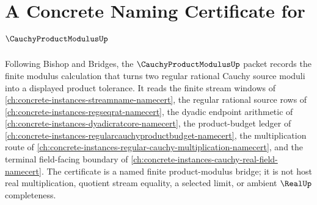 \chapter{A Concrete Naming Certificate for $\CauchyProductModulusUp$}
\label{ch:concrete-instances-cauchy-product-modulus-namecert}

Following Bishop and Bridges, the $\CauchyProductModulusUp$ packet records the finite modulus calculation that turns two regular rational Cauchy source moduli into a displayed product tolerance. It reads the finite stream windows of \autoref{ch:concrete-instances-streamname-namecert}, the regular rational source rows of \autoref{ch:concrete-instances-regseqrat-namecert}, the dyadic endpoint arithmetic of \autoref{ch:concrete-instances-dyadicratcore-namecert}, the product-budget ledger of \autoref{ch:concrete-instances-regularcauchyproductbudget-namecert}, the multiplication route of \autoref{ch:concrete-instances-regular-cauchy-multiplication-namecert}, and the terminal field-facing boundary of \autoref{ch:concrete-instances-cauchy-real-field-namecert}. The certificate is a named finite product-modulus bridge; it is not host real multiplication, quotient stream equality, a selected limit, or ambient $\RealUp$ completeness.

